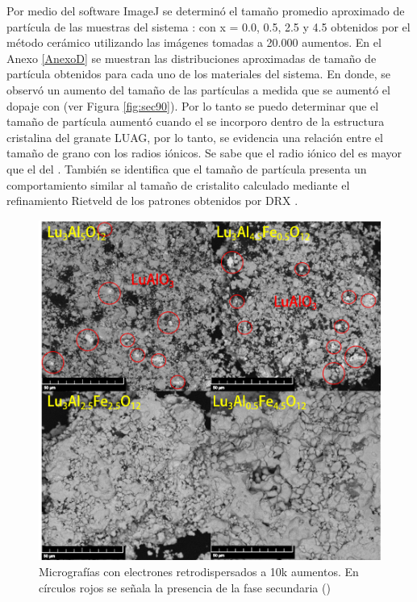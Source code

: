 Por medio del software ImageJ se determinó el tamaño promedio aproximado de
partícula de las muestras del sistema : con x = 0.0, 0.5, 2.5 y
4.5 obtenidos por el método cerámico utilizando las imágenes tomadas a 20.000
aumentos. En el Anexo \ref{AnexoD} se muestran las distribuciones aproximadas de tamaño de
partícula obtenidos para cada uno de los materiales del sistema. En donde, se
observó un aumento del tamaño de las partículas a medida que se aumentó el
dopaje con  (ver Figura \ref{fig:sec90}). Por lo tanto se puedo determinar que el tamaño de partícula
aumentó cuando el  se incorporo dentro de la estructura cristalina del 
granate LUAG, por lo tanto, se evidencia una relación entre el tamaño de grano con los radios iónicos. 
Se sabe que el radio iónico del  es mayor que el del . También se identifica que el
tamaño de partícula presenta un comportamiento similar al tamaño de cristalito
calculado mediante el refinamiento Rietveld de los patrones obtenidos por DRX \cite{Akhtar2017a}.
\\

\begin{figure}[h]
    \centering%

    \includegraphics[width=12cm]{Kap5/ret10k.png}%
    \caption{Micrografías con electrones retrodispersados a 10k aumentos. 
    En círculos rojos se señala la presencia de la fase secundaria () }
    \label{fig:ret10}
\end{figure}

